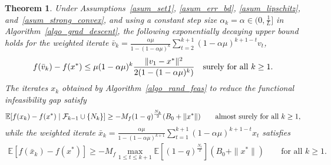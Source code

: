 \documentclass{article}
\def\cF{{\cal F}}
\def\a{\alpha}
\newcommand{\EXP}[1]
{\mathbb{E}\!\left[#1\right] }
\theoremstyle{plain}
\newtheorem{theorem}{Theorem}[section]
\theoremstyle{definition}
\theoremstyle{remark}
\begin{document}
\begin{theorem}\label{thm_sc_conv}
    Under Assumptions~\ref{asum_set1}, \ref{asum_err_bd}, \ref{asum_lipschitz}, and~\ref{asum_strong_convex}, and using a constant step size $\a_k = \a \in (0, \frac{1}{L}]$ in Algorithm~\ref{algo_grad_descent}, the following exponentially decaying upper bound holds for 
    the weighted iterate $\bar v_k = \frac{\a \mu}{1-(1-\a \mu)^k} \sum_{t=2}^{k+1} (1-\a \mu)^{k+1-t} v_t$, 
    \begin{align}
        f(\bar v_k)-f(x^*) \leq \mu (1-\a \mu)^k \frac{\|v_1 - x^*\|^2}{2(1-(1-\a \mu)^k)} 
        \quad\hbox{surely for all $k\ge 1$}. \nonumber
    \end{align}
    The iterates $x_k$ obtained by Algorithm~\ref{algo_rand_feas} to reduce the functional infeasibility gap satisfy
    \begin{align}
        \EXP{f(x_{k}) - f(x^*) \mid \cF_{k-1} \cup \{N_k\}} \geq - M_f (1-q)^{\frac{N_k}{2}} (B_0 + \|x^*\|) \qquad \text{almost surely for all $k\ge 1$}, \nonumber
    \end{align}
    while the weighted iterate $\bar x_k = \frac{\a \mu}{1-(1-\a \mu)^{k+1}} \sum_{t=1}^{k+1} (1-\a \mu)^{k+1-t} x_t$ satisfies
    \begin{align}
        \EXP{f(\bar x_k)-f(x^*)} \geq - M_f \max_{1 \leq t \leq k+1} \EXP{(1-q)^{\frac{N_{t}}{2}}} (B_0 + \|x^*\|) \qquad \text{for all $k\ge 1$}.\nonumber
    \end{align}
\end{theorem}
%
%
%
%
\end{document}
